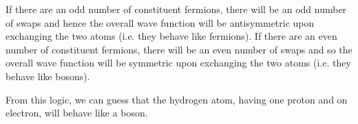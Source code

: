 \documentclass[../principles-of-quantum-mechanics.tex]{subfiles}
\begin{document}
\begin{questions}
\begin{solution}
			If there are an odd number of constituent fermions, there will be an odd number of swaps and hence the overall wave function will be antisymmetric upon exchanging the two atoms (i.e. they behave like fermions). If there are an even number of constituent fermions, there will be an even number of swaps and so the overall wave function will be symmetric upon exchanging the two atoms (i.e. they behave like bosons).
			
			From this logic, we can guess that the hydrogen atom, having one proton and on electron, will behave like a boson.
		\end{solution}
	\end{questions}
\end{document}
